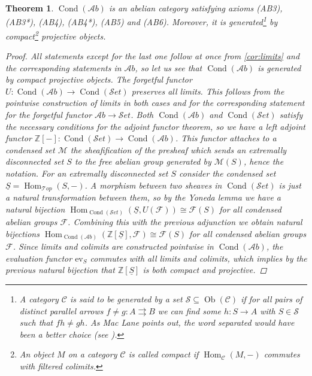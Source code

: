 \documentclass[11pt,A4]{article}
\theoremstyle{plain}
\newtheorem{thm}{Theorem}[section]
\theoremstyle{definition}
\theoremstyle{remark}
\newcommand{\Z}{\mathbb{Z}}
\newcommand{\1}{\mathbbm{1}}
\newcommand{\F}{\mathcal{F}}
\newcommand{\M}{\mathcal{M}}
\newcommand{\scrC}{\mathscr{C}}
\newcommand{\Top}{\mathscr{T}op}
\newcommand{\Ab}{\mathscr{A}b}
\newcommand{\Set}{\mathscr{S}et}
\DeclareMathOperator{\Hom}{Hom}
\DeclareMathOperator{\Cond}{Cond}
\DeclareMathOperator{\Ob}{Ob}
\renewcommand{\u}[1]{\underline{#1}}
\newcommand{\ev}{\mathrm{ev}}
\begin{document}
\begin{thm}\label{thm:abelian}
    $\Cond(\Ab)$ is an abelian category satisfying axioms (AB3), (AB3*), (AB4), (AB4*), (AB5) and (AB6).
    Moreover, it is generated\footnote{A category $\scrC$ is said to be \textit{generated} by a set $\mathscr{S}\subseteq \Ob(\scrC)$ if for all pairs of distinct parallel arrows $f\neq g\colon A\rightrightarrows B$ we can find some $h\colon S\to A$ with $S\in \mathscr{S}$ such that $fh\neq gh$.
    As Mac Lane points out, the word \textit{separated} would have been a better choice (see \cite[Section V.7]{mac78}).} by compact\footnote{An object $M$ on a category $\scrC$ is called \textit{compact} if $\Hom_{\scrC}(M,-)$ commutes with filtered colimits.} projective objects.
    \begin{proof}
	All statements except for the last one follow at once from \cref{cor:limits} and the corresponding statements in $\Ab$, so let us see that $\Cond(\Ab)$ is generated by compact projective objects.
	The forgetful functor $U\colon \Cond(\Ab)\to \Cond(\Set)$ preserves all limits.
	This follows from the pointwise construction of limits in both cases and for the corresponding statement for the forgetful functor $\Ab\to \Set$.
	Both $\Cond(\Ab)$ and $\Cond(\Set)$ satisfy the necessary conditions for the adjoint functor theorem, so we have a left adjoint functor $\Z[-]\colon\Cond(\Set)\to \Cond(\Ab)$.
	This functor attaches to a condensed set $\M$ the sheafification of the presheaf which sends an extremally disconnected set $S$ to the free abelian group generated by $\M(S)$, hence the notation.
	For an extremally disconnected set $S$ consider the condensed set $\u{S}=\Hom_{\Top}(S,-)$.
	A morphism between two sheaves in $\Cond(\Set)$ is just a natural transformation between them, so by the Yoneda lemma we have a natural bijection $\Hom_{\Cond(\Set)}(\u{S},U(\F))\cong \F(S)$ for all condensed abelian groups $\F$.
	Combining this with the previous adjunction we obtain natural bijections $\Hom_{\Cond(\Ab)}(\Z[\u{S}],\F)\cong \F(S)$ for all condensed abelian groups $\F$.
	Since limits and colimits are constructed pointwise in $\Cond(\Ab)$, the evaluation functor $\ev_{S}$ commutes with all limits and colimits, which implies by the previous natural bijection that $\Z[\u{S}]$ is both compact and projective.
	

\end{proof}
\end{thm}
\end{document}
